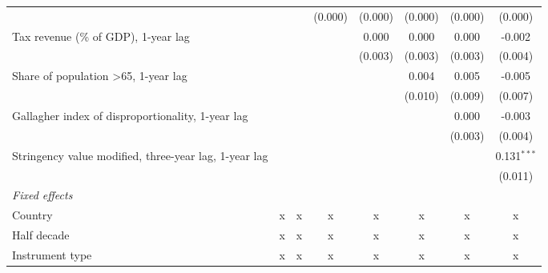 \begin{tabular}{lccccccc}
                                                                            &               &               & (0.000)       & (0.000)       & (0.000)       & (0.000)       & (0.000)\\   
   Tax revenue (\% of GDP), 1-year lag                                      &               &               &               & 0.000         & 0.000         & 0.000         & -0.002\\   
                                                                            &               &               &               & (0.003)       & (0.003)       & (0.003)       & (0.004)\\   
   Share of population >65, 1-year lag                                      &               &               &               &               & 0.004         & 0.005         & -0.005\\   
                                                                            &               &               &               &               & (0.010)       & (0.009)       & (0.007)\\   
   Gallagher index of disproportionality, 1-year lag                        &               &               &               &               &               & 0.000         & -0.003\\   
                                                                            &               &               &               &               &               & (0.003)       & (0.004)\\   
   Stringency value modified, three-year lag, 1-year lag                    &               &               &               &               &               &               & 0.131$^{***}$\\   
                                                                            &               &               &               &               &               &               & (0.011)\\   
   \emph{Fixed effects}\\
   Country                                                                  & x             & x             & x             & x             & x             & x             & x\\  
   Half decade                                                              & x             & x             & x             & x             & x             & x             & x\\  
   Instrument type                                                          & x             & x             & x             & x             & x             & x             & x\\  

\end{tabular}
